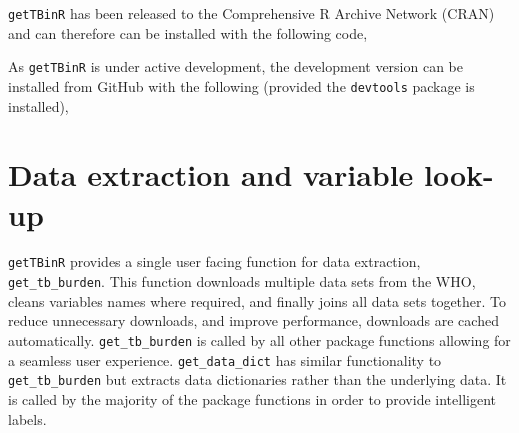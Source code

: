 \documentclass[11pt,twoside]{bristolthesis}
\begin{document}
  \texttt{getTBinR} has been released to the Comprehensive R Archive Network (CRAN) and can therefore can be installed with the following code,
  \begin{Shaded}
  \begin{Highlighting}[]
  \NormalTok{(}\NormalTok{)}
  \end{Highlighting}
  \end{Shaded}
  As \texttt{getTBinR} is under active development, the development version can be installed from GitHub with the following (provided the \texttt{devtools} package is installed),
  \begin{Shaded}
  \begin{Highlighting}[]
  \OperatorTok{::}\NormalTok{(}\NormalTok{)}
  \end{Highlighting}
  \end{Shaded}
  \hypertarget{data-extraction-and-variable-look-up}{%
  \section{Data extraction and variable look-up}\label{data-extraction-and-variable-look-up}}
  
  \texttt{getTBinR} provides a single user facing function for data extraction, \texttt{get\_tb\_burden}. This function downloads multiple data sets from the WHO, cleans variables names where required, and finally joins all data sets together. To reduce unnecessary downloads, and improve performance, downloads are cached automatically. \texttt{get\_tb\_burden} is called by all other package functions allowing for a seamless user experience. \texttt{get\_data\_dict} has similar functionality to \texttt{get\_tb\_burden} but extracts data dictionaries rather than the underlying data. It is called by the majority of the package functions in order to provide intelligent labels.
  
\end{document}
